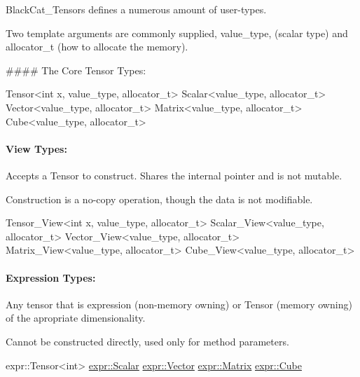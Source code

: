 Black\+Cat\+\_\+\+Tensor\textquotesingle{}s defines a numerous amount of user-\/types.

Two template arguments are commonly supplied, value\+\_\+type, (scalar type) and allocator\+\_\+t (how to allocate the memory).

\#\#\#\# The Core Tensor Types\+: 
\begin{DoxyCode}
Tensor<int x, value\_type, allocator\_t> 
Scalar<value\_type, allocator\_t>
Vector<value\_type, allocator\_t>
Matrix<value\_type, allocator\_t>
Cube<value\_type, allocator\_t>
\end{DoxyCode}


\paragraph*{View Types\+:}


\begin{DoxyItemize}
\item Accepts a Tensor to construct. Shares the internal pointer and is not mutable.
\item Construction is a no-\/copy operation, though the data is not modifiable. 
\begin{DoxyCode}
Tensor\_View<int x, value\_type, allocator\_t>
Scalar\_View<value\_type, allocator\_t>
Vector\_View<value\_type, allocator\_t>
Matrix\_View<value\_type, allocator\_t>
Cube\_View<value\_type, allocator\_t>
\end{DoxyCode}

\end{DoxyItemize}

\paragraph*{Expression Types\+:}


\begin{DoxyItemize}
\item Any tensor that is expression (non-\/memory owning) or Tensor (memory owning) of the apropriate dimensionality.
\item Cannot be constructed directly, used only for method parameters. 
\begin{DoxyCode}
expr::Tensor<int> 
\hyperlink{namespaceBC_1_1tensors_1_1common__using_a22de9a173f6aa6b07a3b4f543c9ad5c1}{expr::Scalar}
\hyperlink{namespaceBC_1_1tensors_1_1common__using_ab2d6784064c0dda8aef3c2a9177ffa77}{expr::Vector}
\hyperlink{namespaceBC_1_1tensors_1_1common__using_a6fc3153d379a42b1a97df46ed5b71a29}{expr::Matrix}
\hyperlink{namespaceBC_1_1tensors_1_1common__using_af5058c3831b2497cff925e51a93737d8}{expr::Cube}
\end{DoxyCode}
 
\end{DoxyItemize}